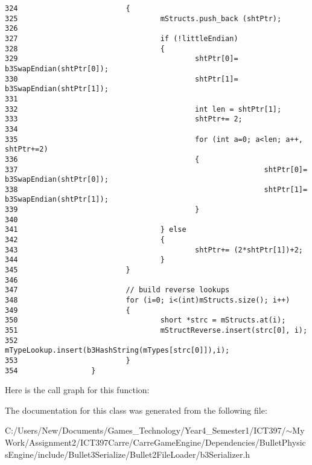 \begin{Code}
\begin{verbatim}
324                         {
325                                 mStructs.push_back (shtPtr);
326                                 
327                                 if (!littleEndian)
328                                 {
329                                         shtPtr[0]= b3SwapEndian(shtPtr[0]);
330                                         shtPtr[1]= b3SwapEndian(shtPtr[1]);
331 
332                                         int len = shtPtr[1];
333                                         shtPtr+= 2;
334 
335                                         for (int a=0; a<len; a++, shtPtr+=2)
336                                         {
337                                                         shtPtr[0]= b3SwapEndian(shtPtr[0]);
338                                                         shtPtr[1]= b3SwapEndian(shtPtr[1]);
339                                         }
340 
341                                 } else
342                                 {
343                                         shtPtr+= (2*shtPtr[1])+2;
344                                 }
345                         }
346 
347                         // build reverse lookups
348                         for (i=0; i<(int)mStructs.size(); i++)
349                         {
350                                 short *strc = mStructs.at(i);
351                                 mStructReverse.insert(strc[0], i);
352                                 mTypeLookup.insert(b3HashString(mTypes[strc[0]]),i);
353                         }
354                 }
\end{verbatim}
\end{Code}




Here is the call graph for this function:

The documentation for this class was generated from the following file:\begin{CompactItemize}
\item 
C:/Users/New/Documents/Games\_\-Technology/Year4\_\-Semester1/ICT397/$\sim$My Work/Assignment2/ICT397Carre/CarreGameEngine/Dependencies/BulletPhysicsEngine/include/Bullet3Serialize/Bullet2FileLoader/b3Serializer.h\end{CompactItemize}

